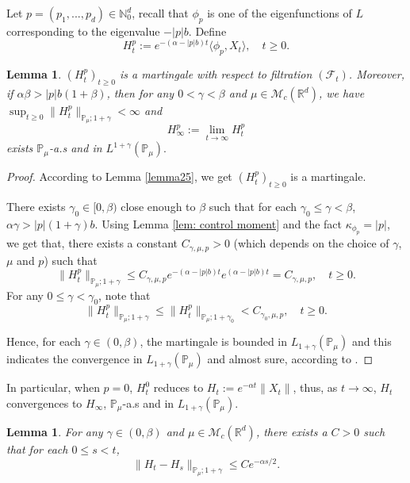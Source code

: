 \documentclass[12pt,oneside,english]{amsart}
\theoremstyle{plain}
\newtheorem{lem}[thm]{Lemma}
\theoremstyle{definition}
\numberwithin{equation}{section}
\begin{document}
    Let $p=(p_1,...,p_d)\in \mathbb N_0^d$, recall that $\phi_p$ is one of the eigenfunctions of $L$ corresponding to the eigenvalue $-|p|b$. Define
$$H_t^p:=e^{-(\alpha-|p|b)t}\langle\phi_p,X_t\rangle, \quad t\geq 0.$$

\begin{lem}\label{lemma26}
    $(H^p_t)_{t\geq 0}$ is a martingale with respect to filtration $(\mathscr F_t)$.
    Moreover, if $\alpha\beta>|p|b(1+\beta)$, then for any $0< \gamma<\beta$ and $\mu \in \mathcal M_c(\mathbb R^d)$, we have $\sup_{t\geq 0}\|H_t^p\|_{\mathbb P_\mu;1+\gamma}< \infty$ and
$$H_{\infty}^p:=\lim_{t\rightarrow \infty}H_t^p$$
exists $\mathbb{P}_{\mu}$-a.s and in $L^{1+\gamma}(\mathbb{P}_{\mu}).$
\end{lem}
\begin{proof}
    According to Lemma \ref{lemma25}, we get $(H_t^p)_{t\geq 0}$ is a martingale.

    There exists $\gamma_0 \in [0,\beta)$ close enough to $\beta$ such that for each $\gamma_0 \leq \gamma < \beta$, $\alpha\gamma>|p|(1+\gamma)b$.
    Using  Lemma \ref{lem: control moment} and the fact $\kappa_{\phi_p}=|p|$, we get that, there exists a constant $C_{\gamma, \mu, p}>0$ (which depends on the choice of $\gamma$, $\mu$ and $p$)  such that
 $$
 	\|H_t^p\|_{\mathbb P_\mu;1+\gamma}
    \leq C_{\gamma, \mu, p} e^{-(\alpha-|p|b)t}e^{(\alpha-|p|b)t}
    =C_{\gamma, \mu, p}, \quad t\geq 0.
 $$
    For any $0\leq\gamma<\gamma_0$, note that
$$
	\|H_t^p\|_{\mathbb P_\mu;1+\gamma}
	\leq\|H_t^p\|_{\mathbb P_\mu;1+\gamma_0}
	<C_{\gamma_0, \mu, p},
	\quad t\geq 0.
$$

    Hence, for each $\gamma \in (0,\beta)$, the martingale is bounded in $L_{1+\gamma}(\mathbb{P}_{\mu})$ and this indicates the convergence in $L_{1+\gamma}(\mathbb{P}_{\mu}) $ and almost sure,
    according to \cite[Theorem 5.4.5]{Durrett2010Probability}.
\end{proof}

In particular, when $p=0$, $H_t^0$ reduces to $H_t:=e^{-\alpha t}\|X_t\|$, thus, as $t\rightarrow \infty$, $H_t$ convergences to $H_{\infty}$, $\mathbb{P}_{\mu}$-a.s and in $L_{1+\gamma}(\mathbb{P}_{\mu})$.
\begin{lem}\label{lem: control of Wt}
 For any $\gamma\in (0,\beta)$ and $\mu\in \mathcal M_c(\mathbb R^d)$, there exists a $C> 0$ such that for each $0\leq s<t$,
 $$\|H_t-H_s\|_{\mathbb{P}_{\mu};1+\gamma}\leq C e^{-\alpha s/2}.$$
\end{lem}
\end{document}
